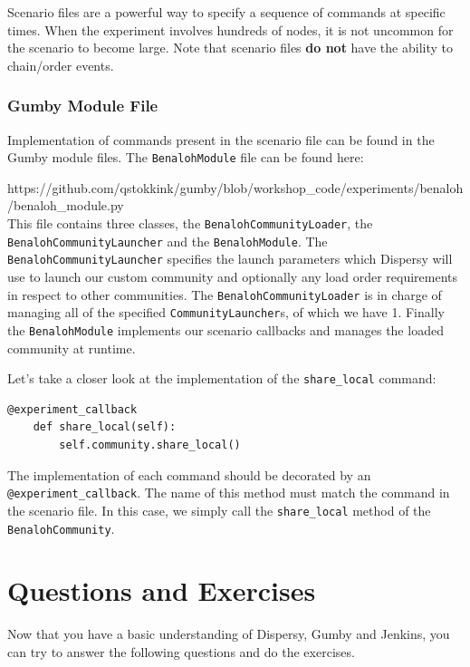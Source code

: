 \documentclass{article}
\begin{document}
Scenario files are a powerful way to specify a sequence of commands at specific times.
When the experiment involves hundreds of nodes, it is not uncommon for the scenario to become large.
Note that scenario files \textbf{do not} have the ability to chain/order events.

\subsubsection{Gumby Module File}
\label{sec:gumby_module}
Implementation of commands present in the scenario file can be found in the Gumby module files.
The \texttt{BenalohModule} file can be found here:

https://github.com/qstokkink/gumby/blob/workshop\_code/experiments/benaloh/benaloh\_module.py\\

This file contains three classes, the \texttt{BenalohCommunityLoader}, the \texttt{BenalohCommunityLauncher} and the \texttt{BenalohModule}.
The \texttt{BenalohCommunityLauncher} specifies the launch parameters which Dispersy will use to launch our custom community and optionally any load order requirements in respect to other communities.
The \texttt{BenalohCommunityLoader} is in charge of managing all of the specified \texttt{CommunityLauncher}s, of which we have 1.
Finally the \texttt{BenalohModule} implements our scenario callbacks and manages the loaded community at runtime.

Let's take a closer look at the implementation of the \texttt{share\_local} command:

\begin{lstlisting}[frame=single]
    @experiment_callback
    def share_local(self):
        self.community.share_local()
\end{lstlisting}

The implementation of each command should be decorated by an \texttt{@experiment\_callback}.
The name of this method must match the command in the scenario file.
In this case, we simply call the \texttt{share\_local} method of the \texttt{BenalohCommunity}.
\newpage
\section{Questions and Exercises}
Now that you have a basic understanding of Dispersy, Gumby and Jenkins, you can try to answer the following questions and do the exercises.
\end{document}
